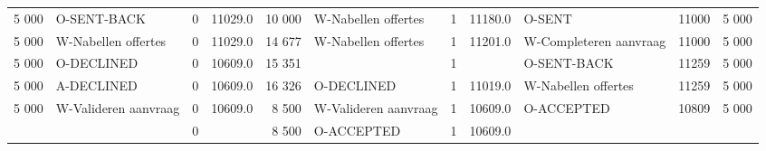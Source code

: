 \begin{tabular}{rlrlrlrllll}
5 000 & O-SENT-BACK & 0 & 11029.0 & 10 000 & W-Nabellen offertes & 1 & 11180.0 & O-SENT & 11000 & 5 000 \\
5 000 & W-Nabellen offertes & 0 & 11029.0 & 14 677 & W-Nabellen offertes & 1 & 11201.0 & W-Completeren aanvraag & 11000 & 5 000 \\
5 000 & O-DECLINED & 0 & 10609.0 & 15 351 &  & 1 &  & O-SENT-BACK & 11259 & 5 000 \\
5 000 & A-DECLINED & 0 & 10609.0 & 16 326 & O-DECLINED & 1 & 11019.0 & W-Nabellen offertes & 11259 & 5 000 \\
5 000 & W-Valideren aanvraag & 0 & 10609.0 & 8 500 & W-Valideren aanvraag & 1 & 10609.0 & O-ACCEPTED & 10809 & 5 000 \\
 &  & 0 &  & 8 500 & O-ACCEPTED & 1 & 10609.0 &  &  &  \\
\bottomrule
\end{tabular}
